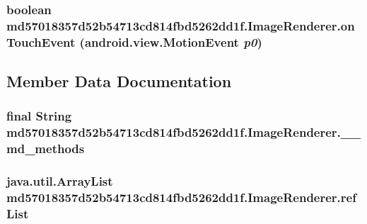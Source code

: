 \hypertarget{classmd57018357d52b54713cd814fbd5262dd1f_1_1_image_renderer_0138cd2d209b20e20429b8d025a44a6a}{
\subsubsection[{onTouchEvent}]{\setlength{\rightskip}{0pt plus 5cm}boolean md57018357d52b54713cd814fbd5262dd1f.ImageRenderer.onTouchEvent (android.view.MotionEvent {\em p0})}}
\label{classmd57018357d52b54713cd814fbd5262dd1f_1_1_image_renderer_0138cd2d209b20e20429b8d025a44a6a}




\subsection{Member Data Documentation}
\hypertarget{classmd57018357d52b54713cd814fbd5262dd1f_1_1_image_renderer_8e8d2f260d749e2e0e874ea565fa7dd1}{
\subsubsection[{\_\-\_\-md\_\-methods}]{\setlength{\rightskip}{0pt plus 5cm}final String {\bf md57018357d52b54713cd814fbd5262dd1f.ImageRenderer.\_\-\_\-md\_\-methods}}}
\label{classmd57018357d52b54713cd814fbd5262dd1f_1_1_image_renderer_8e8d2f260d749e2e0e874ea565fa7dd1}


\hypertarget{classmd57018357d52b54713cd814fbd5262dd1f_1_1_image_renderer_a8958605027a4bc0fadeb74bef6e6aef}{
\subsubsection[{refList}]{\setlength{\rightskip}{0pt plus 5cm}java.util.ArrayList {\bf md57018357d52b54713cd814fbd5262dd1f.ImageRenderer.refList}}}
\label{classmd57018357d52b54713cd814fbd5262dd1f_1_1_image_renderer_a8958605027a4bc0fadeb74bef6e6aef}




